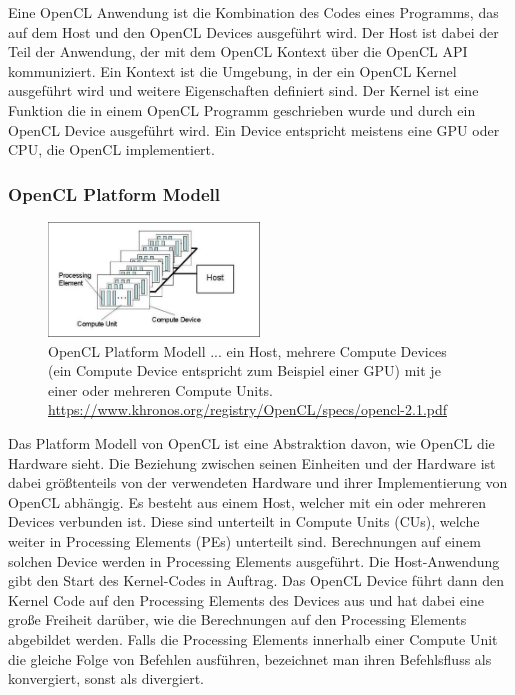 Eine OpenCL Anwendung ist die Kombination des Codes eines Programms, das auf dem Host und den OpenCL Devices ausgeführt wird.
Der Host ist dabei der Teil der Anwendung, der mit dem OpenCL Kontext über die OpenCL API kommuniziert.
Ein Kontext ist die Umgebung, in der ein OpenCL Kernel ausgeführt wird und weitere Eigenschaften definiert sind.
Der Kernel ist eine Funktion die in einem OpenCL Programm geschrieben wurde und durch ein OpenCL Device ausgeführt wird.
Ein Device entspricht meistens eine GPU oder CPU, die OpenCL implementiert. %

\subsubsection*{OpenCL Platform Modell}
\begin{figure}
	\centering
	\includegraphics[width=0.5\textwidth]{../../Grafiken/OpenCL_PlatformModel.png}
	\caption{OpenCL Platform Modell ... ein Host, mehrere Compute Devices (ein Compute Device entspricht zum Beispiel einer GPU) mit je einer oder mehreren Compute Units. \url{https://www.khronos.org/registry/OpenCL/specs/opencl-2.1.pdf}}
	\label{fig::ga02}
\end{figure}
Das Platform Modell von OpenCL ist eine Abstraktion davon, wie OpenCL die Hardware sieht.
Die Beziehung zwischen seinen Einheiten und der Hardware ist dabei größtenteils von der verwendeten Hardware und ihrer Implementierung von OpenCL abhängig.
Es besteht aus einem Host, welcher mit ein oder mehreren Devices verbunden ist.
Diese sind unterteilt in Compute Units (CUs), welche weiter in Processing Elements (PEs) unterteilt sind.
Berechnungen auf einem solchen Device werden in Processing Elements ausgeführt.
Die Host-Anwendung gibt den Start des Kernel-Codes in Auftrag.
Das OpenCL Device führt dann den Kernel Code auf den Processing Elements des Devices aus und hat dabei eine große Freiheit darüber, wie die Berechnungen auf den Processing Elements abgebildet werden.
Falls die Processing Elements innerhalb einer Compute Unit die gleiche Folge von Befehlen ausführen, bezeichnet man ihren Befehlsfluss als konvergiert, sonst als divergiert.

